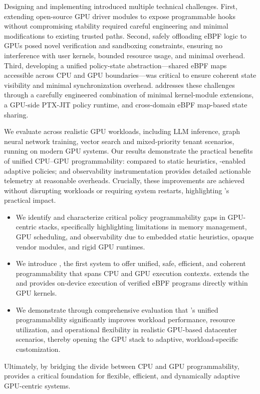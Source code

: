 Designing and implementing \sys introduced multiple technical challenges. First, extending open-source GPU driver modules to expose programmable hooks without compromising stability required careful engineering and minimal modifications to existing trusted paths. Second, safely offloading eBPF logic to GPUs posed novel verification and sandboxing constraints, ensuring no interference with user kernels, bounded resource usage, and minimal overhead. Third, developing a unified policy-state abstraction---shared eBPF maps accessible across CPU and GPU boundaries---was critical to ensure coherent state visibility and minimal synchronization overhead. \sys addresses these challenges through a carefully engineered combination of minimal kernel-module extensions, a GPU-side PTX-JIT policy runtime, and cross-domain eBPF map-based state sharing.

We evaluate \sys across realistic GPU workloads, including LLM inference, graph neural network training, vector search and mixed-priority tenant scenarios, running on modern GPU systems. Our results demonstrate the practical benefits of unified CPU--GPU programmability: compared to static heuristics, \sys-enabled adaptive policies; and observability instrumentation provides detailed actionable telemetry at reasonable overheads. Crucially, these improvements are achieved without disrupting workloads or requiring system restarts, highlighting \sys's practical impact.

\begin{itemize}[leftmargin=*,itemsep=0pt]
    \item We identify and characterize critical policy programmability gaps in GPU-centric stacks, specifically highlighting limitations in memory management, GPU scheduling, and observability due to embedded static heuristics, opaque vendor modules, and rigid GPU runtimes.

    \item We introduce \sys, the first system to offer unified, safe, efficient, and coherent programmability that spans CPU and GPU execution contexts. \sys extends the \sysdriver and provides on-device execution of verified eBPF programs directly within GPU kernels.

    \item We demonstrate through comprehensive evaluation that \sys's unified programmability significantly improves workload performance, resource utilization, and operational flexibility in realistic GPU-based datacenter scenarios, thereby opening the GPU stack to adaptive, workload-specific customization.
\end{itemize}

Ultimately, by bridging the divide between CPU and GPU programmability, \sys provides a critical foundation for flexible, efficient, and dynamically adaptive GPU-centric systems.


